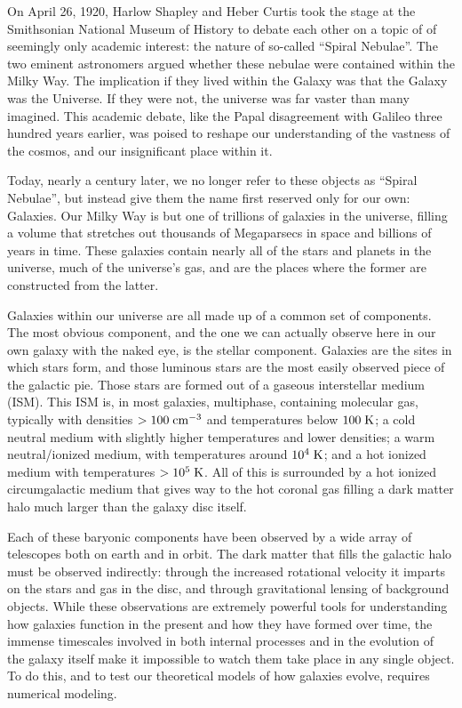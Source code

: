 On April 26, 1920, Harlow Shapley and Heber Curtis took the stage at the
Smithsonian National Museum of History to debate each other on a topic of of
seemingly only academic interest: the nature of so-called ``Spiral Nebulae''.
The two eminent astronomers argued whether these nebulae were contained within
the Milky Way.  The implication if they lived within the Galaxy was that the
Galaxy was the Universe.  If they were not, the universe was far vaster than
many imagined.  This academic debate, like the Papal disagreement with Galileo
three hundred years earlier, was poised to reshape our understanding of the
vastness of the cosmos, and our insignificant place within it.

Today, nearly a century later, we no longer refer to these objects as ``Spiral
Nebulae'', but instead give them the name first reserved only for our own:
Galaxies.  Our Milky Way is but one of trillions of galaxies in the universe,
filling a volume that stretches out thousands of Megaparsecs in space and
billions of years in time.  These galaxies contain nearly all of the stars and
planets in the universe, much of the universe's gas, and are the places where
the former are constructed from the latter.

Galaxies within our universe are all made up of a common set of components.  The
most obvious component, and the one we can actually observe here in our own
galaxy with the naked eye, is the stellar component.  Galaxies are the sites in
which stars form, and those luminous stars are the most easily observed piece of
the galactic pie.  Those stars are formed out of a gaseous
interstellar medium (ISM).  This ISM is, in most galaxies, multiphase,
containing molecular gas, typically with densities $>100\;\rm{cm^{-3}}$ and
temperatures below $100\;\rm{K}$; a cold neutral medium with slightly higher
temperatures and lower densities; a warm neutral/ionized medium, with
temperatures around $10^4\;\rm{K}$; and a hot ionized medium with temperatures
$>10^5\;\rm{K}$.  All of this is surrounded by a hot ionized circumgalactic
medium that gives way to the hot coronal gas filling a dark matter halo much
larger than the galaxy disc itself.

Each of these baryonic components have been observed by a wide array of
telescopes both on earth and in orbit.  The dark matter that fills the galactic
halo must be observed indirectly: through the increased rotational velocity it
imparts on the stars and gas in the disc, and through gravitational lensing of
background objects.  While these observations are extremely powerful tools for
understanding how galaxies function in the present and how they have formed over
time, the immense timescales involved in both internal processes and in the
evolution of the galaxy itself make it impossible to watch them take place in
any single object.  To do this, and to test our theoretical models of how
galaxies evolve, requires numerical modeling.

